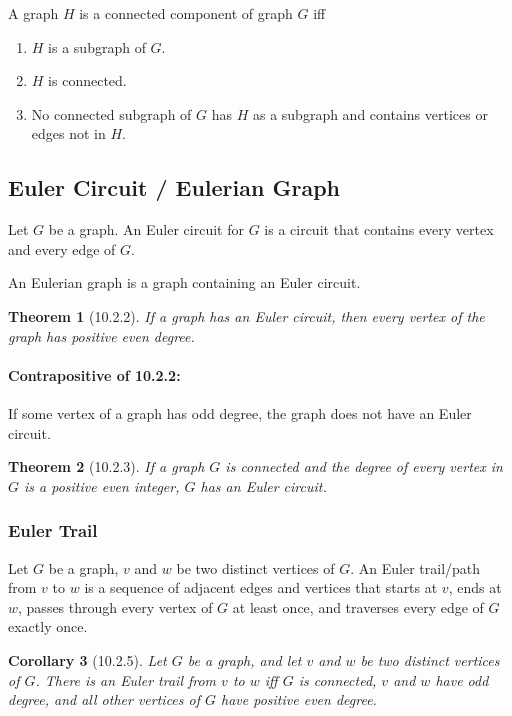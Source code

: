 \documentclass{article}
\theoremstyle{plain}
\newtheorem{theorem}{Theorem}[section]
\newtheorem{corollary}[theorem]{Corollary}
\theoremstyle{definition}
\theoremstyle{remark}
\begin{document}
A graph $H$ is a connected component of graph $G$ iff
\begin{enumerate}
    \item $H$ is a subgraph of $G$.
    \item $H$ is connected.
    \item No connected subgraph of $G$ has $H$ as a subgraph and contains vertices or edges not in $H$.
\end{enumerate}
 
\subsection{Euler Circuit / Eulerian Graph}
Let $G$ be a graph. An Euler circuit for $G$ is a circuit that contains every vertex and every edge of $G$.
 
An Eulerian graph is a graph containing an Euler circuit.
 
\begin{theorem}[10.2.2]
    If a graph has an Euler circuit, then every vertex of the graph has positive even degree.
\end{theorem}
 
\paragraph{Contrapositive of 10.2.2:} If some vertex of a graph has odd degree, the graph does not have an Euler circuit.
 
\begin{theorem}[10.2.3]
    If a graph $G$ is connected and the degree of every vertex in $G$ is a positive even integer, $G$ has an Euler circuit.
\end{theorem}
 
\subsubsection*{Euler Trail}
Let $G$ be a graph, $v$ and $w$ be two distinct vertices of $G$. An Euler trail/path from $v$ to $w$ is a sequence of adjacent edges and vertices that starts at $v$, ends at $w$, passes through every vertex of $G$ at least once, and traverses every edge of $G$ exactly once.
 
\begin{corollary}[10.2.5]
    Let $G$ be a graph, and let $v$ and $w$ be two distinct vertices of $G$. There is an Euler trail from $v$ to $w$ iff $G$ is connected, $v$ and $w$ have odd degree, and all other vertices of $G$ have positive even degree.
\end{corollary}
 
\end{document}
